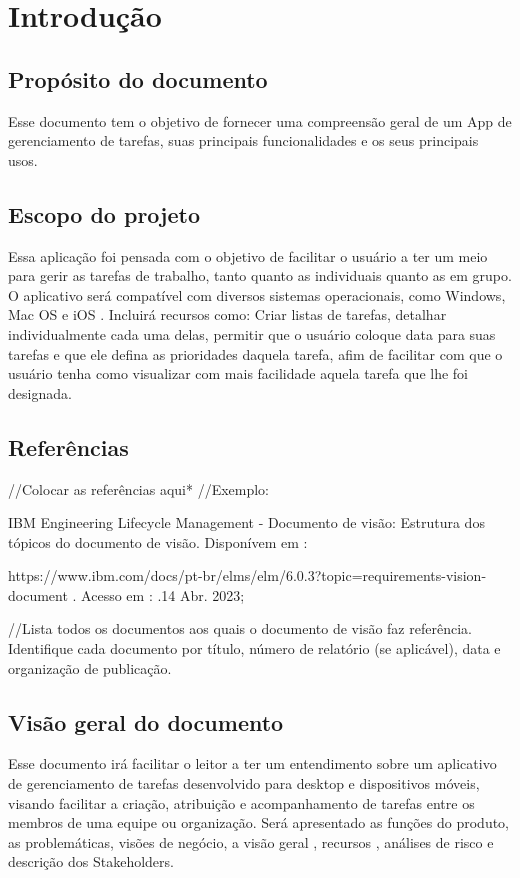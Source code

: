 \chapter{Introdução}
\section{Propósito do documento}
Esse documento tem o objetivo de fornecer uma compreensão geral de um App de gerenciamento de tarefas, suas principais funcionalidades e os seus principais usos.
\section{Escopo do projeto}
Essa aplicação foi pensada com o objetivo de facilitar o usuário a ter um meio para gerir as tarefas de trabalho, tanto quanto as individuais quanto as em grupo. O aplicativo será compatível com diversos sistemas operacionais, como Windows, Mac OS e iOS . Incluirá recursos como: Criar listas de tarefas, detalhar individualmente cada uma delas, permitir que o usuário coloque data para suas tarefas e que ele defina as prioridades daquela tarefa, afim de facilitar com que o usuário tenha como visualizar com mais facilidade aquela tarefa que lhe foi designada.
\section{Referências}
//Colocar as referências aqui*
//Exemplo:

IBM Engineering Lifecycle Management - Documento de visão: Estrutura dos tópicos do documento de visão.
Disponívem em : 

https://www.ibm.com/docs/pt-br/elms/elm/6.0.3?topic=requirements-vision-document . Acesso em : .14 Abr. 2023;

//Lista todos os documentos aos quais o documento de visão faz referência. Identifique cada documento por título, número de relatório (se aplicável), data e organização de publicação.
\section{Visão geral do documento}
Esse documento irá facilitar o leitor a ter um entendimento sobre um aplicativo de gerenciamento de tarefas desenvolvido para desktop e dispositivos móveis, visando facilitar a criação, atribuição e acompanhamento de tarefas entre os membros de uma equipe ou organização. Será apresentado as funções do produto, as problemáticas, visões de negócio, a visão geral , recursos , análises de risco e descrição dos Stakeholders.


